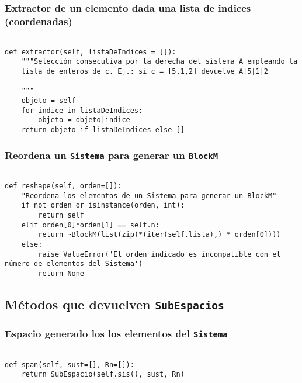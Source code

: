 \documentclass[11pt]{report}
\begin{document}
\subsubsection{Extractor de un elemento dada una lista de indices (coordenadas)}
\label{sec:org05f078e}

\begin{verbatim}

def extractor(self, listaDeIndices = []):
    """Selección consecutiva por la derecha del sistema A empleando la
    lista de enteros de c. Ej.: si c = [5,1,2] devuelve A|5|1|2

    """
    objeto = self
    for indice in listaDeIndices:
        objeto = objeto|indice
    return objeto if listaDeIndices else []

\end{verbatim}

\subsubsection{Reordena un \texttt{Sistema} para generar un \texttt{BlockM}}
\label{sec:orga88a970}
\begin{verbatim}
   
def reshape(self, orden=[]):
    "Reordena los elementos de un Sistema para generar un BlockM"
    if not orden or isinstance(orden, int):
        return self
    elif orden[0]*orden[1] == self.n:
        return ~BlockM(list(zip(*(iter(self.lista),) * orden[0])))
    else:
        raise ValueError('El orden indicado es incompatible con el número de elementos del Sistema')
        return None

\end{verbatim}

\subsection{Métodos que devuelven \texttt{SubEspacios}}
\label{sec:org1713e0d}
\subsubsection{Espacio generado los los elementos del \texttt{Sistema}}
\label{sec:orgd32e554}

\begin{verbatim}

def span(self, sust=[], Rn=[]):
    return SubEspacio(self.sis(), sust, Rn)

\end{verbatim}
\end{document}
